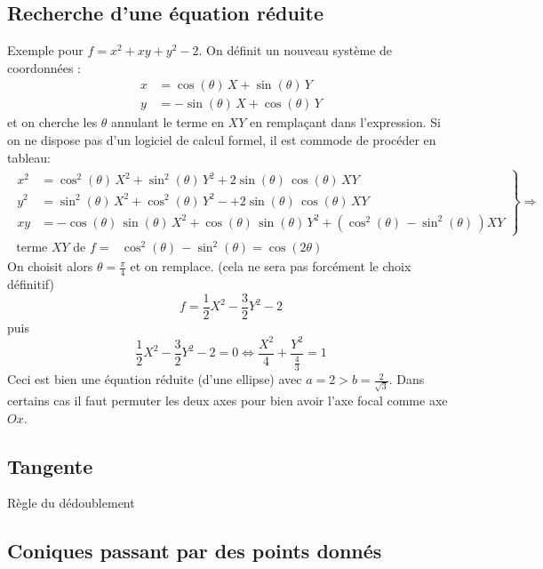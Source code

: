 \subsection{Recherche d'une équation réduite}
Exemple pour $f = x^2 + xy +y^2 -2$.
On définit un nouveau système de coordonnées :
\begin{displaymath}
\begin{aligned}
 x &= \cos (\theta)\, X + \sin(\theta)\, Y \\
 y &= -\sin (\theta)\, X +\cos (\theta)\, Y
\end{aligned} 
\end{displaymath}
et on cherche les $\theta$ annulant le terme en $XY$ en remplaçant dans l'expression. Si on ne dispose pas d'un logiciel de calcul formel, il est commode de procéder en tableau:
\begin{multline*}
 \left.
\begin{aligned}
 x^2 &= \cos^2 (\theta)\, X^2 + \sin^2(\theta)\, Y^2 + 2 \sin(\theta)\, \cos (\theta)\, XY \\ 
 y^2 &= \sin^2 (\theta)\, X^2 + \cos^2 (\theta)\, Y^2-+ 2 \sin(\theta)\, \cos (\theta)\, XY\\
 xy &= -\cos (\theta)\, \sin (\theta)\, X^2+\cos (\theta)\, \sin (\theta)\, Y^2 +(\cos^2(\theta)\, -\sin^2(\theta)\,)XY
\end{aligned}
 \right\rbrace 
\Rightarrow \\
\text{ terme $XY$ de $f =$ } \cos^2(\theta)\, -\sin^2(\theta)=\cos(2\theta)
\end{multline*}
On choisit alors $\theta=\frac{\pi}{4}$ et on remplace. (cela ne sera pas forcément le choix définitif)
\begin{displaymath}
 f = \frac{1}{2}X^2 - \frac{3}{2}Y^2 -2
\end{displaymath}
puis 
\begin{displaymath}
 \frac{1}{2}X^2 - \frac{3}{2}Y^2 -2 = 0
\Leftrightarrow
\frac{X^2}{4}+\frac{Y^2}{\frac{4}{3}} = 1
\end{displaymath}
Ceci est bien une équation réduite (d'une ellipse) avec $a=2>b=\frac{2}{\sqrt{3}}$. Dans certains cas il faut permuter les deux axes pour bien avoir l'axe focal comme axe $Ox$.
\subsection{Tangente}
Règle du dédoublement
\subsection{Coniques passant par des points donnés}
